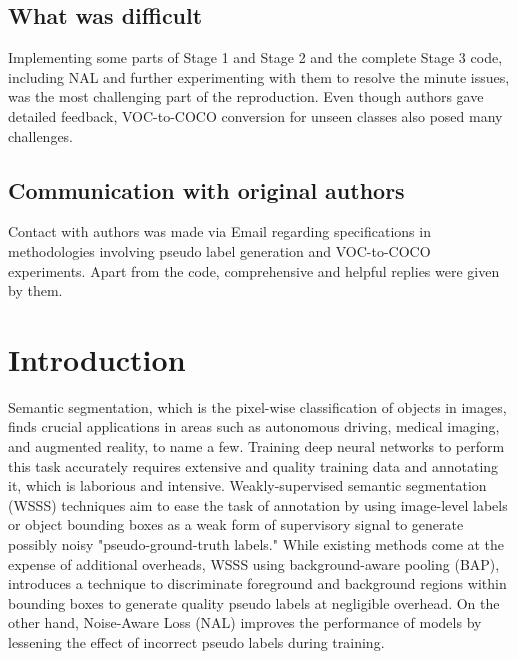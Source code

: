 \subsection*{What was difficult}
Implementing some parts of Stage 1 and Stage 2 and the complete Stage 3 code, including NAL and further experimenting with them to resolve the minute issues, was the most challenging part of the reproduction. Even though authors gave detailed feedback, VOC-to-COCO conversion for unseen classes also posed many challenges.

\subsection*{Communication with original authors}

Contact with authors was made via Email regarding specifications in methodologies involving pseudo label generation and VOC-to-COCO experiments. Apart from the code, comprehensive and helpful replies were given by them.

\newpage

\section{Introduction}
Semantic segmentation, which is the pixel-wise classification of objects in images, finds crucial applications in areas such as autonomous driving, medical imaging, and augmented reality, to name a few. Training deep neural networks to perform this task accurately requires extensive and quality training data and annotating it, which is laborious and intensive. Weakly-supervised semantic segmentation (WSSS) techniques aim to ease the task of annotation by using image-level labels or object bounding boxes as a weak form of supervisory signal to generate possibly noisy "pseudo-ground-truth labels." While existing methods come at the expense of additional overheads, WSSS using background-aware pooling (BAP), introduces a technique to discriminate foreground and background regions within bounding boxes to generate quality pseudo labels at negligible overhead. On the other hand, Noise-Aware Loss (NAL) improves the performance of models by lessening the effect of incorrect pseudo labels during training.

